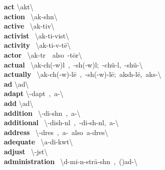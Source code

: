 \documentclass[10pt,a4paper]{article}
\begin{document}
\begin{multicols}{2}
\textbf{ act }\quad \textbackslash \textprimstress akt\textbackslash \\
\textbf{ action }\quad \ \textbackslash \textprimstress ak-sh\textschwa n\textbackslash \\
\textbf{ active }\quad \ \textbackslash \textprimstress ak-tiv\textbackslash \\
\textbf{ activist }\quad \ \textbackslash \textprimstress ak-ti-vist\textbackslash \\
\textbf{ activity }\quad \ \textbackslash ak-\textprimstress ti-v\textschwa -t\={e}\textbackslash \\
\textbf{ actor }\quad \ \textbackslash \textprimstress ak-t\textschwa r\ \ also\ -\textsecstress t\.{o}r\textbackslash \\
\textbf{ actual }\quad \ \textbackslash \textprimstress ak-ch(\textschwa -w)\textschwa l\ ,\ -sh(\textschwa -w)\textschwa l;\ -ch\"{u}-\textschwa l,\ -sh\"{u}-\textbackslash \\
\textbf{ actually }\quad \ \textbackslash \textprimstress ak-ch(\textschwa -w)\textschwa -l\={e}\ ,\ -sh(\textschwa -w)\textschwa -l\={e};\ \textprimstress aksh-l\={e},\ \textprimstress aks-\textbackslash \\
\textbf{ ad }\quad \textbackslash \textprimstress ad\textbackslash \\
\textbf{ adapt }\quad \textbackslash \textschwa -\textprimstress dapt\ ,\ a-\textbackslash \\
\textbf{ add }\quad \textbackslash \textprimstress ad\textbackslash \\
\textbf{ addition }\quad \ \textbackslash \textschwa -\textprimstress di-sh\textschwa n\ ,\ a-\textbackslash \\
\textbf{ additional }\quad \ \textbackslash \textschwa -\textprimstress dish-n\textschwa l\ ,\ -\textprimstress di-sh\textschwa -n\textsuperscript{\textreve}l,\ a-\textbackslash \\
\textbf{ address }\quad \ \textbackslash \textschwa -\textprimstress dres\ ,\ a-\ also\ \textprimstress a-\textsecstress dres\textbackslash \\
\textbf{ adequate }\quad \ \textbackslash \textprimstress a-di-kw\textschwa t\textbackslash \\
\textbf{ adjust }\quad \ \textbackslash \textschwa -\textprimstress j\textschwa st\textbackslash \\
\textbf{ administration }\quad \ \textbackslash \textschwa d-\textsecstress mi-n\textschwa -\textprimstress str\={a}-sh\textschwa n\ ,\ (\textsecstress )ad-\textbackslash \\

\end{multicols}
\end{document}
